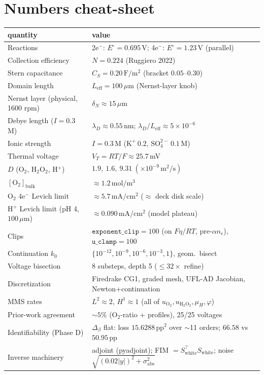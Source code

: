 \documentclass[11pt]{article}
\newcommand{\VT}{V_{T}}
\newcommand{\Eeq}{E^{\circ}}
\newcommand{\CS}{C_{S}}
\newcommand{\Leff}{L_{\mathrm{eff}}}
\newcommand{\bulk}{\mathrm{bulk}}
\begin{document}
\section{Numbers cheat-sheet}\label{sec:numbers}
\begin{center}\small
\begin{tabular}{ll}
\toprule
quantity & value\\
\midrule
Reactions & 2e$^-$: $\Eeq=0.695$\,V; 4e$^-$: $\Eeq=1.23$\,V (parallel)\\
Collection efficiency & $N=0.224$ (Ruggiero 2022)\\
Stern capacitance & $\CS=0.20\,\mathrm{F/m^2}$ (bracket $0.05$--$0.30$)\\
Domain length & $\Leff=100\,\mu$m (Nernst-layer knob)\\
Nernst layer (physical, 1600 rpm) & $\delta_N\approx15\,\mu$m\\
Debye length ($I=0.3$\,M) & $\lambda_D\approx0.55$\,nm; $\lambda_D/\Leff\approx5\times10^{-6}$\\
Ionic strength & $I=0.3$\,M ($\mathrm{K^+}\,0.2$, $\mathrm{SO_4^{2-}}\,0.1$\,M)\\
Thermal voltage & $\VT=RT/F\approx25.7$\,mV\\
$D$ (O$_2$, H$_2$O$_2$, H$^+$) & $1.9,\ 1.6,\ 9.31\ (\times10^{-9}\,\mathrm{m^2/s})$\\
$[\mathrm{O_2}]_{\bulk}$ & $\approx1.2\,\mathrm{mol/m^3}$\\
O$_2$ 4e$^-$ Levich limit & $\approx5.7\,\mathrm{mA/cm^2}$ ($\approx$ deck disk scale)\\
H$^+$ Levich limit (pH 4, $100\,\mu$m) & $\approx0.090\,\mathrm{mA/cm^2}$ (model plateau)\\
Clips & $\texttt{exponent\_clip}=100$ (on $F\eta/RT$, pre-$\alpha n_e$), $\texttt{u\_clamp}=100$\\
Continuation $k_0$ & $\{10^{-12},10^{-9},10^{-6},10^{-3},1\}$, geom.\ bisect\\
Voltage bisection & 8 substeps, depth 5 ($\le32\times$ refine)\\
Discretization & Firedrake CG1, graded mesh, UFL-AD Jacobian, Newton+continuation\\
MMS rates & $L^2\approx2$, $H^1\approx1$ (all of $u_{\mathrm{O_2}},u_{\mathrm{H_2O_2}},\mu_H,\varphi$)\\
Prior-work agreement & $\sim5\%$ (O$_2$-ratio + profiles), 25/25 voltages\\
Identifiability (Phase D) & $\Delta_\beta$ flat: loss $15.6288\,\mathrm{pp^2}$ over $\sim$11 orders; $66.58$ vs $50.95$\,pp\\
Inverse machinery & adjoint (pyadjoint); FIM $=S^\top_{\mathrm{white}}S_{\mathrm{white}}$; noise $\sqrt{(0.02|y|)^2+\sigma_{\mathrm{abs}}^2}$\\
\bottomrule
\end{tabular}
\end{center}
\end{document}
